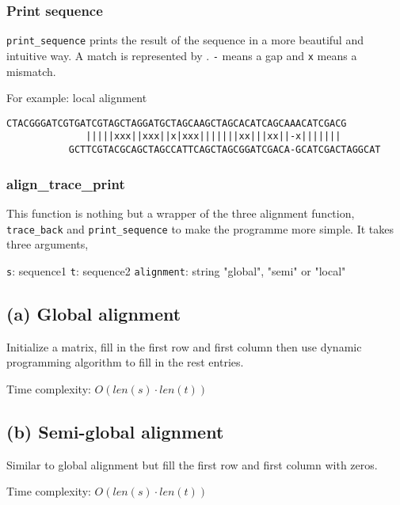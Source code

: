 \documentclass[]{article}
\begin{document}
\hypertarget{header-n31}{%
\subsubsection{Print sequence}\label{header-n31}}

\texttt{print\_sequence} prints the result of the sequence in a more
beautiful and intuitive way. A match is represented by
\texttt{\textbar{}}. \texttt{-} means a gap and \texttt{x} means a
mismatch.

For example: local alignment

\begin{verbatim}
CTACGGGATCGTGATCGTAGCTAGGATGCTAGCAAGCTAGCACATCAGCAAACATCGACG
              |||||xxx||xxx||x|xxx|||||||xx|||xx||-x|||||||
           GCTTCGTACGCAGCTAGCCATTCAGCTAGCGGATCGACA-GCATCGACTAGGCAT
\end{verbatim}

\hypertarget{header-n39}{%
\subsubsection{align\_trace\_print}\label{header-n39}}

This function is nothing but a wrapper of the three alignment function,
\texttt{trace\_back} and \texttt{print\_sequence} to make the programme
more simple. It takes three arguments,

\texttt{s}: sequence1 \texttt{t}: sequence2 \texttt{alignment}: string
"global", "semi" or "local"

\hypertarget{header-n48}{%
\subsection{(a) Global alignment}\label{header-n48}}

Initialize a matrix, fill in the first row and first column then use
dynamic programming algorithm to fill in the rest entries.

Time complexity: \(O(len(s) \cdot len(t))\)

\hypertarget{header-n54}{%
\subsection{(b) Semi-global alignment}\label{header-n54}}

Similar to global alignment but fill the first row and first column with
zeros.

Time complexity: \(O(len(s) \cdot len(t))\)
\end{document}
